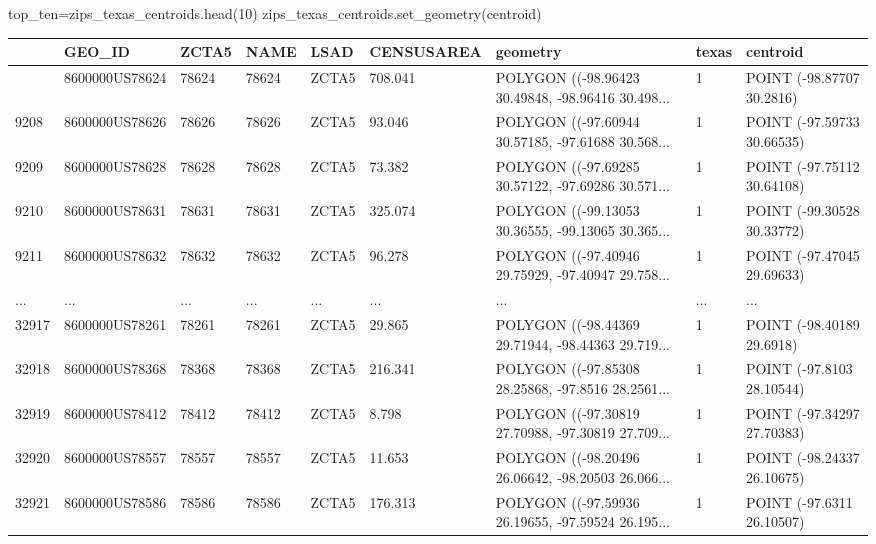 \documentclass[
  letterpaper,
  DIV=11,
  numbers=noendperiod]{scrartcl}
\newenvironment{Shaded}{\begin{snugshade}}{\end{snugshade}}
\newcommand{\DecValTok}[1]{\textcolor[rgb]{0.68,0.00,0.00}{#1}}
\newcommand{\NormalTok}[1]{\textcolor[rgb]{0.00,0.23,0.31}{#1}}
\newcommand{\OperatorTok}[1]{\textcolor[rgb]{0.37,0.37,0.37}{#1}}
\newcommand{\StringTok}[1]{\textcolor[rgb]{0.13,0.47,0.30}{#1}}
\begin{document}
\begin{Shaded}
\begin{Highlighting}[]
\NormalTok{top\_ten}\OperatorTok{=}\NormalTok{zips\_texas\_centroids.head(}\DecValTok{10}\NormalTok{)}
\NormalTok{zips\_texas\_centroids.set\_geometry(}\StringTok{\textquotesingle{}centroid\textquotesingle{}}\NormalTok{)}
\end{Highlighting}
\end{Shaded}

\begin{longtable}[]{@{}lllllllll@{}}
\toprule\noalign{}
& GEO\_ID & ZCTA5 & NAME & LSAD & CENSUSAREA & geometry & texas &
centroid \\
\midrule\noalign{}
\endhead
\bottomrule\noalign{}
\endlastfoot
9207 & 8600000US78624 & 78624 & 78624 & ZCTA5 & 708.041 & POLYGON
((-98.96423 30.49848, -98.96416 30.498... & 1 & POINT (-98.87707
30.2816) \\
9208 & 8600000US78626 & 78626 & 78626 & ZCTA5 & 93.046 & POLYGON
((-97.60944 30.57185, -97.61688 30.568... & 1 & POINT (-97.59733
30.66535) \\
9209 & 8600000US78628 & 78628 & 78628 & ZCTA5 & 73.382 & POLYGON
((-97.69285 30.57122, -97.69286 30.571... & 1 & POINT (-97.75112
30.64108) \\
9210 & 8600000US78631 & 78631 & 78631 & ZCTA5 & 325.074 & POLYGON
((-99.13053 30.36555, -99.13065 30.365... & 1 & POINT (-99.30528
30.33772) \\
9211 & 8600000US78632 & 78632 & 78632 & ZCTA5 & 96.278 & POLYGON
((-97.40946 29.75929, -97.40947 29.758... & 1 & POINT (-97.47045
29.69633) \\
... & ... & ... & ... & ... & ... & ... & ... & ... \\
32917 & 8600000US78261 & 78261 & 78261 & ZCTA5 & 29.865 & POLYGON
((-98.44369 29.71944, -98.44363 29.719... & 1 & POINT (-98.40189
29.6918) \\
32918 & 8600000US78368 & 78368 & 78368 & ZCTA5 & 216.341 & POLYGON
((-97.85308 28.25868, -97.8516 28.2561... & 1 & POINT (-97.8103
28.10544) \\
32919 & 8600000US78412 & 78412 & 78412 & ZCTA5 & 8.798 & POLYGON
((-97.30819 27.70988, -97.30819 27.709... & 1 & POINT (-97.34297
27.70383) \\
32920 & 8600000US78557 & 78557 & 78557 & ZCTA5 & 11.653 & POLYGON
((-98.20496 26.06642, -98.20503 26.066... & 1 & POINT (-98.24337
26.10675) \\
32921 & 8600000US78586 & 78586 & 78586 & ZCTA5 & 176.313 & POLYGON
((-97.59936 26.19655, -97.59524 26.195... & 1 & POINT (-97.6311
26.10507) \\
\end{longtable}
\end{document}
